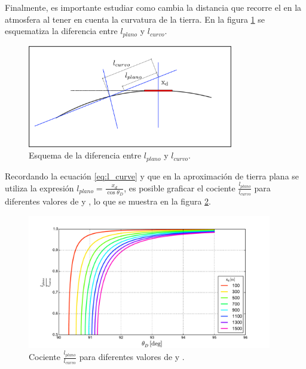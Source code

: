 	Finalmente, es importante estudiar como cambia la distancia que recorre el \tauon{} en la atmosfera al tener en cuenta la curvatura de la tierra.
	En la figura \ref{fig:curveEarthSketch_plano_vs_curvo} se esquematiza la diferencia entre $l_{plano}$ y $l_{curvo}$.
	\begin{figure}[ht!]
		\centering
		\includegraphics[width=0.8\textwidth]{./fig/appendix/curveEarthSketch_plano_vs_curvo.pdf}
		\caption{\label{fig:curveEarthSketch_plano_vs_curvo}
		Esquema de la diferencia entre $l_{plano}$ y $l_{curvo}$.
		}
	\end{figure}
	Recordando la ecuaci\'on \ref{eq:l_curve} y que en la aproximaci\'on de tierra plana se utiliza la expresi\'on $l_{plano}=\frac{x_d}{\cos \theta_D}$, es posible graficar el cociente $\frac{l_{plano}}{l_{curvo}}$ para diferentes valores de \xd{} y \td{}, lo que se muestra en la figura \ref{fig:lp_lc}.
	\begin{figure}[ht!]
		\centering
		\includegraphics[width=0.95\textwidth]{./fig/appendix/lPlane_lCurve}
		\caption{\label{fig:lp_lc}
		Cociente $\frac{l_{plano}}{l_{curvo}}$ para diferentes valores de \xd{} y \td{}.
		}
	\end{figure}
